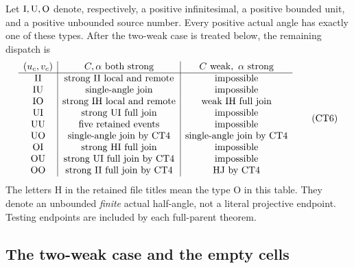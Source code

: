 Let \({\rm I},{\rm U},{\rm O}\) denote, respectively, a positive
infinitesimal, a positive bounded unit, and a positive unbounded
source number.  Every positive actual angle has exactly one of
these types.  After the two-weak case is treated below, the
remaining dispatch is
\[
\begin{array}{c|c|c}
(u_c,v_c)&C,\alpha\text{ both strong}
                 &C\text{ weak},\ \alpha\text{ strong}\\ \hline
{\rm II}&\text{strong II local and remote}&\text{impossible}\\
{\rm IU}&\text{single-angle join}&\text{impossible}\\
{\rm IO}&\text{strong IH local and remote}&\text{weak IH full join}\\
{\rm UI}&\text{strong UI full join}&\text{impossible}\\
{\rm UU}&\text{five retained events}&\text{impossible}\\
{\rm UO}&\text{single-angle join by CT4}&\text{single-angle join by CT4}\\
{\rm OI}&\text{strong HI full join}&\text{impossible}\\
{\rm OU}&\text{strong UI full join by CT4}&\text{impossible}\\
{\rm OO}&\text{strong II full join by CT4}&\text{HJ by CT4}
\end{array}\tag{CT6}
\]
The letters H in the retained file titles mean the type O in this
table.  They denote an unbounded \emph{finite} actual half-angle,
not a literal projective endpoint.  Testing endpoints are included
by each full-parent theorem.

\subsection{The two-weak case and the empty cells}

